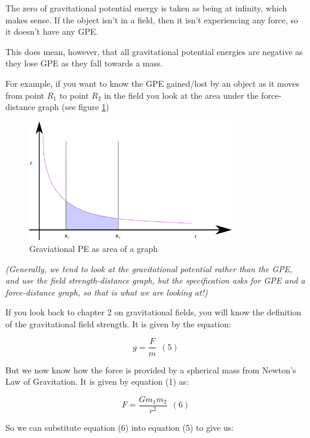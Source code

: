 \documentclass[revision-guide.tex]{subfiles}
\begin{document}
The zero of gravitational potential energy is taken as being at
infinity, which makes sense. If the object isn't in a field, then it
isn't experiencing any force, so it doesn't have any GPE.

This does mean, however, that all gravitational potential energies are
negative as they lose GPE as they fall towards a mass.

For example, if you want to know the GPE gained/lost by an object as it
moves from point $R_1$ to point $R_2$ in the field you look at the area under
the force-distance graph (see figure \ref{gpe-area})

\begin{figure}
  \begin{center}
  \includegraphics[width=0.8\textwidth]{figs/chapt-13/area-energy.png}
\end{center}
  \caption{Graviational PE as area of a graph}
  \label{gpe-area}
\end{figure}


\emph{(Generally, we tend to look at the gravitational potential rather
than the GPE, and use the field strength-distance graph, but the
specification asks for GPE and a force-distance graph, so that is what
we are looking at!)}


If you look back to chapter 2 on gravitational fields, you will know the
definition of the gravitational field strength. It is given by the
equation:

\[g = \frac{F}{m}\ \ (5)\]

But we now know how the force is provided by a spherical mass from
Newton's Law of Gravitation. It is given by equation (1) as:

\[F = \frac{Gm_{1}m_{2}}{r^{2}}\ \ (6)\]

So we can substitute equation (6) into equation (5) to give us:
\end{document}
